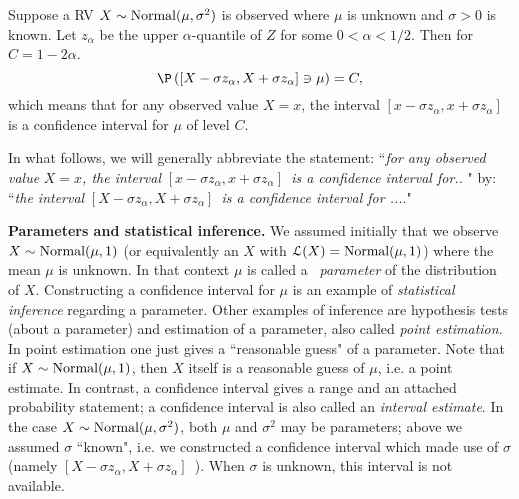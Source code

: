 \begin{prop}
\label{prop-normal-CI}Suppose a RV $X\sim \mbox{{\rm Normal}}(\mu ,\sigma ^{2})$ is observed
where $\mu $ is unknown and $\sigma >0$ is known. Let $z_{\alpha}$
be the upper $\alpha $-quantile of $Z$ for some $0<\alpha <1/2$. Then for $%
C=1-2\alpha $.%
\begin{equation*}
\P \left( \left[ X-\sigma z_{\alpha},X+\sigma z_{\alpha}%
\right] \ni \mu \right) =C,
\end{equation*}%
which means that for any observed value $X=x$, the interval $\left[ x-\sigma
z_{\alpha},x+\sigma z_{\alpha}\right] $ is a confidence
interval for $\mu $ of level $C$.
\end{prop}

In what follows, we will generally abbreviate the statement: ``\textit{for
any observed value }$X=x$\textit{, the interval }$\left[ x-\sigma z_{\alpha},x+\sigma z_{\alpha}\right] $\textit{\ is a confidence
interval for.. }" by: ``\textit{the interval }$\left[ X-\sigma z_{\alpha},X+\sigma z_{\alpha}\right] $\textit{\ is a confidence
interval for ...}."\bigskip

\textbf{Parameters and statistical inference.} We assumed initially that we
observe $X\sim \mbox{{\rm Normal}}(\mu ,1)$ (or equivalently an $X$ with $\mathcal{L}(X)=\mbox{{\rm Normal}}(\mu
,1)$) where the mean $\mu $ is unknown. In that context $\mu $ is called a%
\textit{\ parameter} of the distribution of $X$. Constructing a confidence
interval for $\mu $ is an example of \textit{statistical inference }%
regarding a parameter. Other examples of inference are hypothesis tests
(about a parameter) and estimation of a parameter, also called \textit{point
estimation}. In point estimation one just gives a ``reasonable guess" of a
parameter. Note that if $X\sim \mbox{{\rm Normal}}(\mu ,1)$, then $X$ itself is a reasonable
guess of $\mu $, i.e. a point estimate. In contrast, a confidence interval
gives a range and an attached probability statement; a confidence interval
is also called an \textit{interval estimate}. In the case $X\sim \mbox{{\rm Normal}}(\mu
,\sigma ^{2})$, both $\mu $ and $\sigma ^{2}$ may be parameters; above we
assumed $\sigma $ ``known", i.e. we constructed a confidence interval which
made use of $\sigma $ (namely $\left[ X-\sigma z_{\alpha},X+\sigma
z_{\alpha}\right] $\textit{\ }). When $\sigma $ is unknown, this
interval is not available. \bigskip

